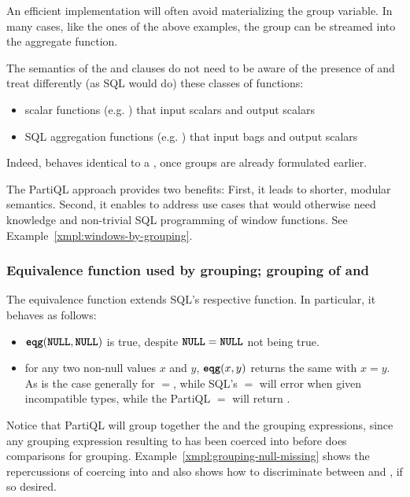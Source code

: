  An efficient implementation will often avoid materializing
the group variable. In many cases, like the ones of the above examples, the
group can be streamed into the aggregate function.

 The semantics of the  and  clauses do
not need to be aware of the presence of  and treat differently (as
SQL would do) these classes of functions: 
\begin{itemize}
\item scalar functions (e.g. \gl{+}) that input scalars and output scalars 
\item SQL aggregation functions (e.g. ) that input bags and output
scalars
\end{itemize}
Indeed,  behaves identical to a , once groups
are already formulated earlier.

The PartiQL approach provides two benefits: First, it leads to shorter, modular
semantics. Second, it enables  to address use cases that would
otherwise need knowledge and non-trivial SQL programming of window functions.
See Example~\ref{xmpl:windows-by-grouping}.

\subsubsection{Equivalence function used by grouping; grouping of \NULL and \MISSING}
\label{sec:eqg}

The equivalence function  extends SQL's respective function. In
particular, it behaves as follows:
\begin{itemize}
\item $\texttt{\textbf{eqg}}(\texttt{\textbf{NULL}}, \texttt{\textbf{NULL}})$ is true, despite $\texttt{\textbf{NULL}}=\texttt{\textbf{NULL}}$ not being true.
\item for any two non-null values $x$ and $y$, $\texttt{\textbf{eqg}}(x,y)$ returns the same
with $x=y$. As is the case generally for $=$, while SQL's $=$ will error when
given incompatible types, while the PartiQL $=$ will return .
\end{itemize}

Notice that PartiQL will group together the \NULL and the \MISSING grouping
expressions, since any grouping expression resulting to \MISSING has been
coerced into \NULL before  does comparisons for grouping.
Example~\ref{xmpl:grouping-null-missing} shows the repercussions of coercing
\NULL into \MISSING and also shows how to discriminate between \NULL and
\MISSING, if so desired.


